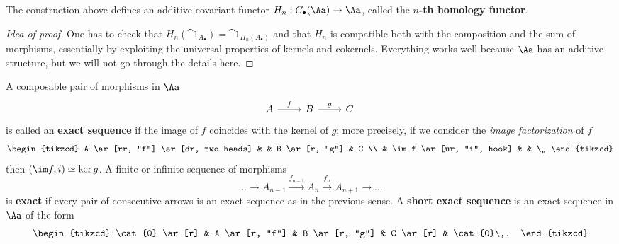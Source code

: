 \begin{prop}
    The construction above defines an additive covariant functor
    $H_{n} : C_{\bullet}(\Aa) \to \Aa$, called the
    \textbf{$n$-th homology functor}.
    \begin{proof}[Idea of proof]
        One has to check that $H_{n}(\cat{1}_{A_{\bullet}}) 
        = \cat{1}_{H_{n}(A_{\bullet})}$
        and that $H_{n}$ is compatible both with the composition
        and the sum of morphisms, essentially by exploiting
        the universal properties of kernels and cokernels.
        Everything works well because $\Aa$ has an additive structure,
        but we will not go through the details here.
    \end{proof}
\end{prop}

\begin{df}
    A composable pair of morphisms in $\Aa$
    \begin{equation*}
        \begin{tikzcd}
            A \ar[r, "f"] & B \ar[r, "g"] & C\,
        \end{tikzcd}
    \end{equation*}
    is called an \textbf{exact sequence} if
    the image of $f$ coincides with the kernel of $g$;
    more precisely, if we consider the 
    \emph{image factorization} of $f$
    \begin{equation*}
        \begin{tikzcd}
            A \ar[rr, "f"] \ar[dr, two heads] 
            & & B \ar[r, "g"] & C \\
            & \im f \ar[ur, "i", hook] & & \,,
        \end{tikzcd}
    \end{equation*}
    then $(\im f,i) \simeq \ker g$. A finite or infinite
    sequence of morphisms
    \begin{equation*}
        \dots \longrightarrow A_{n-1} \overset{f_{n-1}}{\longrightarrow}
        A_{n} \overset{f_{n}}{\longrightarrow} A_{n+1} \longrightarrow \dots
    \end{equation*}
    is \textbf{exact} if every pair of consecutive
    arrows is an exact sequence as in the previous sense.
    A \textbf{short exact sequence} is an exact sequence
    in $\Aa$ of the form
    \begin{equation*}
        \begin{tikzcd}
            \cat{0} \ar[r] & A \ar[r, "f"] & B \ar[r, "g"] & C \ar[r] & \cat{0}\,.
        \end{tikzcd}
    \end{equation*}
\end{df}

